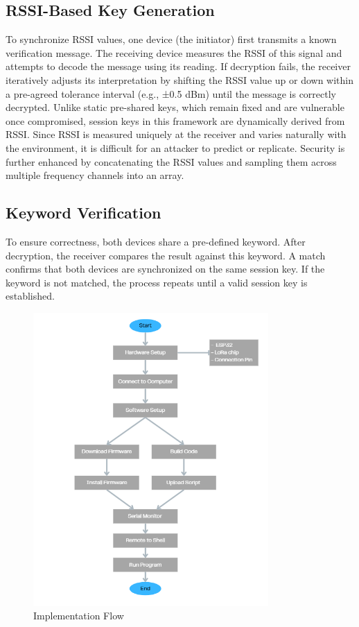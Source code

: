 \subsection{RSSI-Based Key Generation}
To synchronize RSSI values, one device (the initiator) first transmits a known verification message. The receiving device measures the RSSI of this signal and attempts to decode the message using its reading. If decryption fails, the receiver iteratively adjusts its interpretation by shifting the RSSI value up or down within a pre-agreed tolerance interval (e.g., ±0.5 dBm) until the message is correctly decrypted. Unlike static pre-shared keys, which remain fixed and are vulnerable once compromised, session keys in this framework are dynamically derived from RSSI. Since RSSI is measured uniquely at the receiver and varies naturally with the environment, it is difficult for an attacker to predict or replicate. Security is further enhanced by concatenating the RSSI values and sampling them across multiple frequency channels into an array. 

\subsection{Keyword Verification}
To ensure correctness, both devices share a pre-defined keyword. After decryption, the receiver compares the result against this keyword. A match confirms that both devices are synchronized on the same session key. If the keyword is not matched, the process repeats until a valid session key is established.

\begin{figure}[htbp]
\begin{center}
\includegraphics[width=0.8\textwidth]{flow.png}
\end{center}
\caption[Picture]{Implementation Flow}
\label{fig:flow}
\end{figure}

